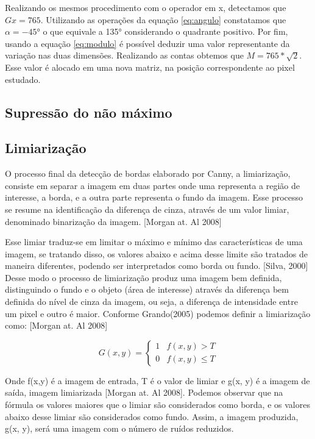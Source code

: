 \documentclass[a4paper,alpha-refs]{RBCA_v1.0}
\begin{document}
Realizando os mesmos procedimento com o operador em x, detectamos que $Gx = 765$. Utilizando as operações da equação \ref{eq:angulo} constatamos que $\alpha = -45°$ o que equivale a 135° considerando o quadrante positivo. Por fim, usando a equação \ref{eq:modulo} é possível deduzir uma valor representante da variação nas duas dimensões. Realizando as contas obtemos que $M = 765*\sqrt{2}$. Esse valor é alocado em uma nova matriz, na posição correspondente ao pixel estudado.


   

\subsection{Supressão do não máximo}
\subsection{Limiarização}

O processo final da detecção de bordas elaborado por Canny, a limiarização, consiste em separar a imagem em duas partes onde uma representa a região de interesse, a borda, e a outra parte representa o fundo da imagem.  Esse processo se resume na identificação da diferença de cinza, através de um valor limiar, denominado binarização da imagem. [Morgan at. Al 2008]

Esse limiar traduz-se em limitar o máximo e mínimo das características de uma imagem, se tratando disso, os valores abaixo e acima desse limite são tratados de maneira diferentes, podendo ser interpretados como borda ou fundo. [Silva, 2000] 
Desse modo o processo de limiarização produz uma imagem bem definida, distinguindo o fundo e o objeto (área de interesse) através da diferença bem definida do nível de cinza da imagem, ou seja, a diferença de intensidade entre um pixel e outro é maior. Conforme Grando(2005) podemos definir a limiarização como: [Morgan at. Al 2008]
	     
\begin{equation}
 G(x,y)=\begin{cases} 1 & f(x,y)>T \\ 
   
 0 & f(x,y)\le T \end{cases}
\end{equation}
	     
Onde f(x,y) é a imagem de entrada, T é o valor de limiar e g(x, y) é a imagem de saída, imagem limiarizada [Morgan at. Al 2008]. Podemos observar que na fórmula os valores maiores que o limiar são considerados como borda, e os valores abaixo desse limiar são considerados como fundo. Assim, a imagem produzida, g(x, y), será uma imagem com o número de ruídos reduzidos.
\end{document}
